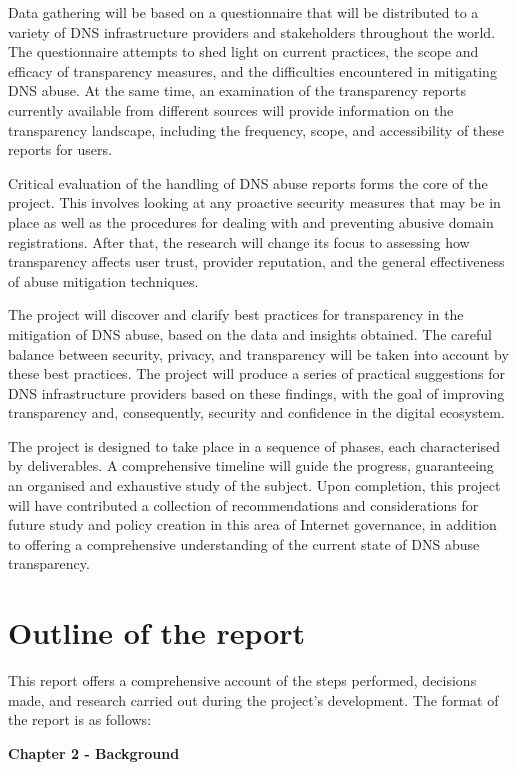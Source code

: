 Data gathering will be based on a questionnaire that will be distributed to a variety of DNS infrastructure providers and stakeholders throughout the world. The questionnaire attempts to shed light on current practices, the scope and efficacy of transparency measures, and the difficulties encountered in mitigating DNS abuse. At the same time, an examination of the transparency reports currently available from different sources will provide information on the transparency landscape, including the frequency, scope, and accessibility of these reports for users.

Critical evaluation of the handling of DNS abuse reports forms the core of the project. This involves looking at any proactive security measures that may be in place as well as the procedures for dealing with and preventing abusive domain registrations. After that, the research will change its focus to assessing how transparency affects user trust, provider reputation, and the general effectiveness of abuse mitigation techniques.

The project will discover and clarify best practices for transparency in the mitigation of DNS abuse, based on the data and insights obtained. The careful balance between security, privacy, and transparency will be taken into account by these best practices. The project will produce a series of practical suggestions for DNS infrastructure providers based on these findings, with the goal of improving transparency and, consequently, security and confidence in the digital ecosystem.

The project is designed to take place in a sequence of phases, each characterised by deliverables. A comprehensive timeline will guide the progress, guaranteeing an organised and exhaustive study of the subject. Upon completion, this project will have contributed a collection of recommendations and considerations for future study and policy creation in this area of Internet governance, in addition to offering a comprehensive understanding of the current state of DNS abuse transparency.

\section{Outline of the report}

This report offers a comprehensive account of the steps performed, decisions made, and research carried out during the project's development. The format of the report is as follows:

\textbf{Chapter 2 - Background }

